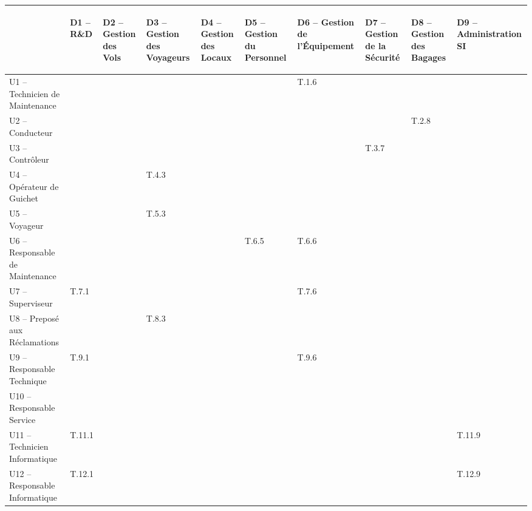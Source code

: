 \providecommand{\DJSPU}[1]{}

\vspace{-2cm}
\begin{turn}{-90}
\begin {tabular} {| l | l | l | l | l | l | l | l | l | l | }
\hline
~
&\begin{sideways}D1 -- R\&D\end{sideways}
&\begin{sideways}D2 -- Gestion des Vols\end{sideways}
&\begin{sideways}D3 -- Gestion des Voyageurs\end{sideways}
&\begin{sideways}D4 -- Gestion des Locaux\end{sideways}
&\begin{sideways}D5 -- Gestion du Personnel\end{sideways}
&\begin{sideways}D6 -- Gestion de l'Équipement\end{sideways}
&\begin{sideways}D7 -- Gestion de la Sécurité\end{sideways}
&\begin{sideways}D8 -- Gestion des Bagages\end{sideways}
&\begin{sideways}D9 -- Administration SI\end{sideways}\\
\hline
U1 --  Technicien de Maintenance  & & & & & &T.1.6 & & &  \\
\hline
U2 --  Conducteur  & & & & & & & &T.2.8 &  \\
\hline
U3 --  Contrôleur  & & & & & & &T.3.7 & &  \\
\hline
U4 --  Opérateur de Guichet  & & &T.4.3 & & & & & &  \\
\hline
U5 --  Voyageur  & & &T.5.3 & & & & & &  \\
\hline
U6 --  Responsable de Maintenance  & & & & &T.6.5 &T.6.6 & &  &\\
\hline
U7 --  Superviseur  &\DJSPU1 T.7.1 & & & & &T.7.6 & & &\\
\hline
U8 --  Preposé aux Réclamations  & & &T.8.3 & & & & & &\\
\hline
U9 --  Responsable Technique  &\DJSPU1 T.9.1 & & & & &T.9.6 & & &\\
\hline
U10 --  Responsable Service  & & & & & & & & &  \\
\hline
U11 --  Technicien Informatique  &T.11.1 & & & & & & & &T.11.9  \\
\hline
U12 --  Responsable Informatique  &T.12.1 & & & & & & & &T.12.9  \\
\hline
\end {tabular}
\end{turn}

